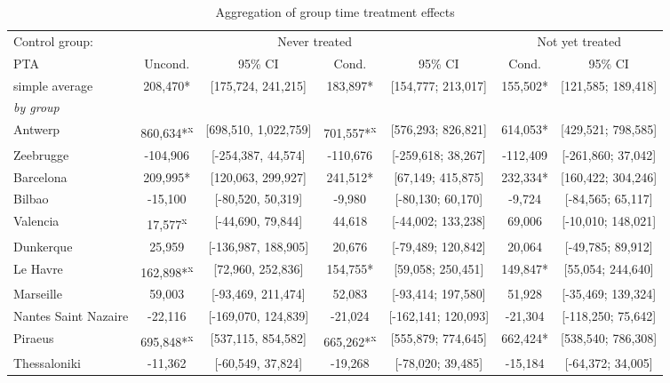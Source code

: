 \begin{table}[ht]
\centering
\caption{Aggregation of group time treatment effects} 
\begingroup\begin{adjustbox}{max width=\textwidth}
\begin{tabular}{lcccccc}
  \hline
\hline
Control group: & \multicolumn{4}{c}{Never treated} & \multicolumn{2}{c}{Not yet treated} \\
 \cmidrule(lr){2-5} \cmidrule(lr){6-7}  PTA & Uncond. & 95\% CI & Cond. & 95\% CI & Cond. & 95\% CI  \\ 
  \hline
simple average &  208,470* & [175,724, 241,215] &  183,897* & [154,777; 213,017] &  155,502* & [121,585; 189,418] \\ 
   [1ex]\emph{by group} &  &  &  &  &  &  \\ 
   \hline
Antwerp &  860,634*\textsuperscript{x} & [698,510, 1,022,759] &  701,557*\textsuperscript{x} & [576,293; 826,821] &  614,053* & [429,521; 798,585] \\ 
  Zeebrugge & -104,906 & [-254,387, 44,574] & -110,676 & [-259,618; 38,267] & -112,409 & [-261,860; 37,042] \\ 
  Barcelona &  209,995* & [120,063, 299,927] &  241,512* & [67,149; 415,875] &  232,334* & [160,422; 304,246] \\ 
  Bilbao &  -15,100 & [-80,520, 50,319] &   -9,980 & [-80,130; 60,170] &   -9,724 & [-84,565; 65,117] \\ 
  Valencia &   17,577\textsuperscript{x} & [-44,690, 79,844] &   44,618 & [-44,002; 133,238] &   69,006 & [-10,010; 148,021] \\ 
  Dunkerque &   25,959 & [-136,987, 188,905] &   20,676 & [-79,489; 120,842] &   20,064 & [-49,785; 89,912] \\ 
  Le Havre &  162,898*\textsuperscript{x} & [72,960, 252,836] &  154,755* & [59,058; 250,451] &  149,847* & [55,054; 244,640] \\ 
  Marseille &   59,003 & [-93,469, 211,474] &   52,083 & [-93,414; 197,580] &   51,928 & [-35,469; 139,324] \\ 
  Nantes Saint Nazaire &  -22,116 & [-169,070, 124,839] &  -21,024 & [-162,141; 120,093] &  -21,304 & [-118,250; 75,642] \\ 
  Piraeus &  695,848*\textsuperscript{x} & [537,115, 854,582] &  665,262*\textsuperscript{x} & [555,879; 774,645] &  662,424* & [538,540; 786,308] \\ 
  Thessaloniki &  -11,362 & [-60,549, 37,824] &  -19,268 & [-78,020; 39,485] &  -15,184 & [-64,372; 34,005] \\ 

\end{tabular}
\end{adjustbox}
\end{table}
